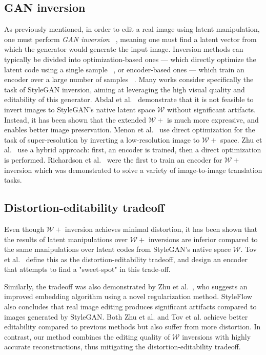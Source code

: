 \subsection{GAN inversion}

As previously mentioned, in order to edit a real image using latent manipulation, one must perform \textit{GAN inversion} ~\cite{zhu2016generative}, meaning one must find a latent vector from which the generator would generate the input image.  Inversion methods can typically be divided into optimization-based ones --- which directly optimize the latent code using a single sample ~\cite{lipton2017precise, creswell2018inverting, abdal2019image2stylegan, karras2020analyzing}, or encoder-based ones --- which train an encoder over a large number of samples ~\cite{perarnau2016invertible, luo2017learning, guan2020collaborative}. Many works consider specifically the task of StyleGAN inversion, aiming at leveraging the high visual quality and editability of this generator. Abdal et al.~\cite{abdal2020image2stylegan++} demonstrate that it is not feasible to invert images to StyleGAN's native latent space $\mathcal{W}$ without significant artifacts. Instead, it has been shown that the extended $\mathcal{W}+$ is much more expressive, and enables better image preservation. Menon et al.~\cite{menon2020pulse} use direct optimization for the task of super-resolution by inverting a low-resolution image to $\mathcal{W+}$ space. Zhu et al.~\cite{zhu2020domain} use a hybrid approach: first, an encoder is trained, then a direct optimization is performed. Richardson et al.~\cite{richardson2020encoding} were the first to train an encoder for $\mathcal{W+}$ inversion which was demonstrated to solve a variety of image-to-image translation tasks. 

\subsection{Distortion-editability tradeoff}

Even though $\mathcal{W+}$ inversion achieves minimal distortion, it has been shown that the results of latent manipulations over $\mathcal{W+}$ inversions are inferior compared to the same manipulations over latent codes from StyleGAN's native space $\mathcal{W}$. Tov et al.~\cite{tov2021designing} define this as the distortion-editability tradeoff, and design an encoder that attempts to find a "sweet-spot" in this trade-off.    

Similarly, the tradeoff was also demonstrated by Zhu et al.~\cite{zhu2020improved}, who suggests an improved embedding algorithm using a novel regularization method. StyleFlow~\cite{abdal2020styleflow} also concludes that real image editing produces significant artifacts compared to images generated by StyleGAN. Both Zhu et al. and Tov et al. achieve better editability compared to previous methods but also suffer from more distortion. In contrast, our method combines the editing quality of $\mathcal{W}$ inversions with highly accurate reconstructions, thus mitigating the distortion-editability tradeoff.

